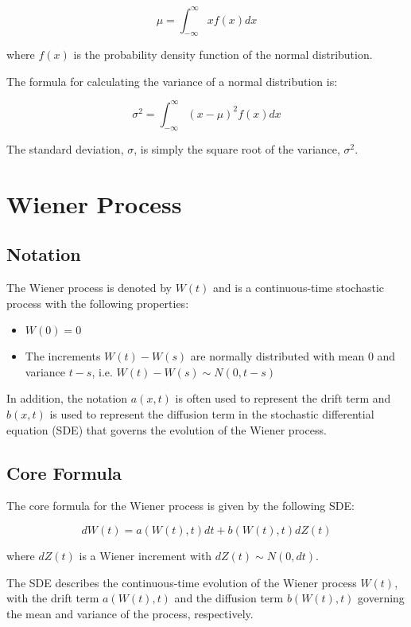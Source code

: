 \documentclass{article}
\theoremstyle{mytheoremstyle}
\theoremstyle{mytheoremstyle}
\theoremstyle{myproblemstyle}
\begin{document}
\begin{equation}
\mu = \int_{-\infty}^{\infty} xf(x) dx
\end{equation}

where $f(x)$ is the probability density function of the normal distribution.

The formula for calculating the variance of a normal distribution is:

\begin{equation}
\sigma^2 = \int_{-\infty}^{\infty} (x-\mu)^2 f(x) dx
\end{equation}

The standard deviation, $\sigma$, is simply the square root of the variance, $\sigma^2$.



\section{Wiener Process}

\subsection{Notation}
The Wiener process is denoted by $W(t)$ and is a continuous-time stochastic process with the following properties:
\begin{itemize}
\item $W(0) = 0$
\item The increments $W(t) - W(s)$ are normally distributed with mean 0 and variance $t-s$, i.e. $W(t)-W(s) \sim N(0,t-s)$
\end{itemize}

In addition, the notation $a(x,t)$ is often used to represent the drift term and $b(x,t)$ is used to represent the diffusion term in the stochastic differential equation (SDE) that governs the evolution of the Wiener process.

\subsection{Core Formula}
The core formula for the Wiener process is given by the following SDE:

\begin{equation}
dW(t) = a(W(t),t)dt + b(W(t),t)dZ(t)
\end{equation}

where $dZ(t)$ is a Wiener increment with $dZ(t) \sim N(0, dt)$.

The SDE describes the continuous-time evolution of the Wiener process $W(t)$, with the drift term $a(W(t),t)$ and the diffusion term $b(W(t),t)$ governing the mean and variance of the process, respectively.
\end{document}
